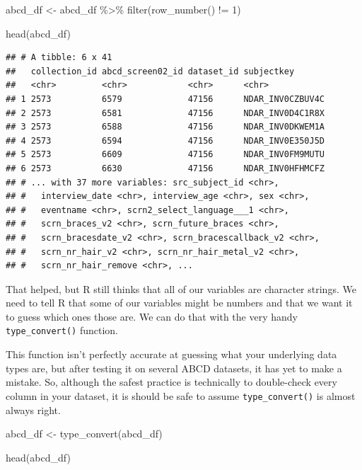 \documentclass[
]{book}
\newenvironment{Shaded}{\begin{snugshade}}{\end{snugshade}}
\newcommand{\DecValTok}[1]{\textcolor[rgb]{0.00,0.00,0.81}{#1}}
\newcommand{\FunctionTok}[1]{\textcolor[rgb]{0.00,0.00,0.00}{#1}}
\newcommand{\NormalTok}[1]{#1}
\newcommand{\OtherTok}[1]{\textcolor[rgb]{0.56,0.35,0.01}{#1}}
\newcommand{\SpecialCharTok}[1]{\textcolor[rgb]{0.00,0.00,0.00}{#1}}
\begin{document}
\begin{Shaded}
\begin{Highlighting}[]
\NormalTok{abcd\_df }\OtherTok{\textless{}{-}}\NormalTok{ abcd\_df }\SpecialCharTok{\%\textgreater{}\%}
  \FunctionTok{filter}\NormalTok{(}\FunctionTok{row\_number}\NormalTok{() }\SpecialCharTok{!=} \DecValTok{1}\NormalTok{)}
  
\FunctionTok{head}\NormalTok{(abcd\_df)}
\end{Highlighting}
\end{Shaded}

\begin{verbatim}
## # A tibble: 6 x 41
##   collection_id abcd_screen02_id dataset_id subjectkey      
##   <chr>         <chr>            <chr>      <chr>           
## 1 2573          6579             47156      NDAR_INV0CZBUV4C
## 2 2573          6581             47156      NDAR_INV0D4C1R8X
## 3 2573          6588             47156      NDAR_INV0DKWEM1A
## 4 2573          6594             47156      NDAR_INV0E350J5D
## 5 2573          6609             47156      NDAR_INV0FM9MUTU
## 6 2573          6630             47156      NDAR_INV0HFHMCFZ
## # ... with 37 more variables: src_subject_id <chr>,
## #   interview_date <chr>, interview_age <chr>, sex <chr>,
## #   eventname <chr>, scrn2_select_language___1 <chr>,
## #   scrn_braces_v2 <chr>, scrn_future_braces <chr>,
## #   scrn_bracesdate_v2 <chr>, scrn_bracescallback_v2 <chr>,
## #   scrn_nr_hair_v2 <chr>, scrn_nr_hair_metal_v2 <chr>,
## #   scrn_nr_hair_remove <chr>, ...
\end{verbatim}

That helped, but R still thinks that all of our variables are character strings. We need to tell R that some of our variables might be numbers and that we want it to guess which ones those are. We can do that with the very handy \texttt{type\_convert()} function.

This function isn't perfectly accurate at guessing what your underlying data types are, but after testing it on several ABCD datasets, it has yet to make a mistake. So, although the safest practice is technically to double-check every column in your dataset, it is should be safe to assume \texttt{type\_convert()} is almost always right.

\begin{Shaded}
\begin{Highlighting}[]
\NormalTok{abcd\_df }\OtherTok{\textless{}{-}} \FunctionTok{type\_convert}\NormalTok{(abcd\_df)}

\FunctionTok{head}\NormalTok{(abcd\_df)}
\end{Highlighting}
\end{Shaded}
\end{document}

